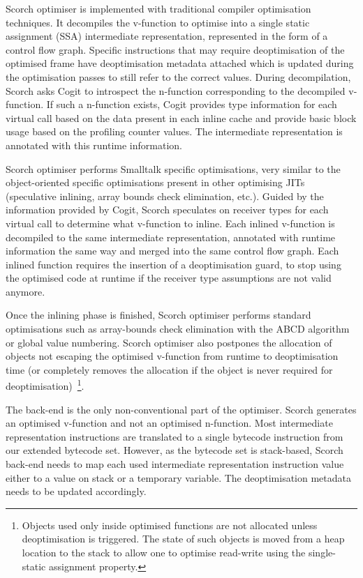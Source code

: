 \documentclass[a4paper,12pt,twoside]{../includes/ThesisStyle}
\begin{document}
Scorch optimiser is implemented with traditional compiler optimisation techniques. It decompiles the v-function to optimise into a single static assignment (SSA) intermediate representation, represented in the form of a control flow graph. Specific instructions that may require deoptimisation of the optimised frame have deoptimisation metadata attached which is updated during the optimisation passes to still refer to the correct values. During decompilation, Scorch asks Cogit to introspect the n-function corresponding to the decompiled v-function. If such a n-function exists, Cogit provides type information for each virtual call based on the data present in each inline cache and provide basic block usage based on the profiling counter values. The intermediate representation is annotated with this runtime information.


Scorch optimiser performs Smalltalk specific optimisations, very similar to the object-oriented specific optimisations present in other optimising JITs (speculative inlining, array bounds check elimination, etc.). Guided by the information provided by Cogit, Scorch speculates on receiver types for each virtual call to determine what v-function to inline. Each inlined v-function is decompiled to the same intermediate representation, annotated with runtime information the same way and merged into the same control flow graph. Each inlined function requires the insertion of a deoptimisation guard, to stop using the optimised code at runtime if the receiver type assumptions are not valid anymore. 

Once the inlining phase is finished, Scorch optimiser performs standard optimisations such as array-bounds check elimination with the ABCD algorithm~\cite{Bodi00a} or global value numbering. Scorch optimiser also postpones the allocation of objects not escaping the optimised v-function from runtime to deoptimisation time (or completely removes the allocation if the object is never required for deoptimisation)~\footnote{Objects used only inside optimised functions are not allocated unless deoptimisation is triggered. The state of such objects is moved from a heap location to the stack to allow one to optimise read-write using the single-static assignment property.}.

The back-end is the only non-conventional part of the optimiser. Scorch generates an optimised v-function and not an optimised n-function. Most intermediate representation instructions are translated to a single bytecode instruction from our extended bytecode set. However, as the bytecode set is stack-based, Scorch back-end needs to map each used intermediate representation instruction value either to a value on stack or a temporary variable. The deoptimisation metadata needs to be updated accordingly.
\end{document}
